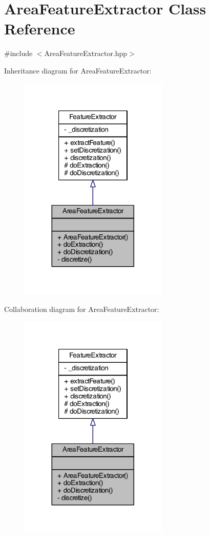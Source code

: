 \hypertarget{class_area_feature_extractor}{\section{Area\+Feature\+Extractor Class Reference}
\label{class_area_feature_extractor}
}


{\ttfamily \#include $<$Area\+Feature\+Extractor.\+hpp$>$}



Inheritance diagram for Area\+Feature\+Extractor\+:
\nopagebreak
\begin{figure}[H]
\begin{center}
\leavevmode
\includegraphics[width=200pt]{class_area_feature_extractor__inherit__graph}
\end{center}
\end{figure}


Collaboration diagram for Area\+Feature\+Extractor\+:
\nopagebreak
\begin{figure}[H]
\begin{center}
\leavevmode
\includegraphics[width=200pt]{class_area_feature_extractor__coll__graph}
\end{center}
\end{figure}
